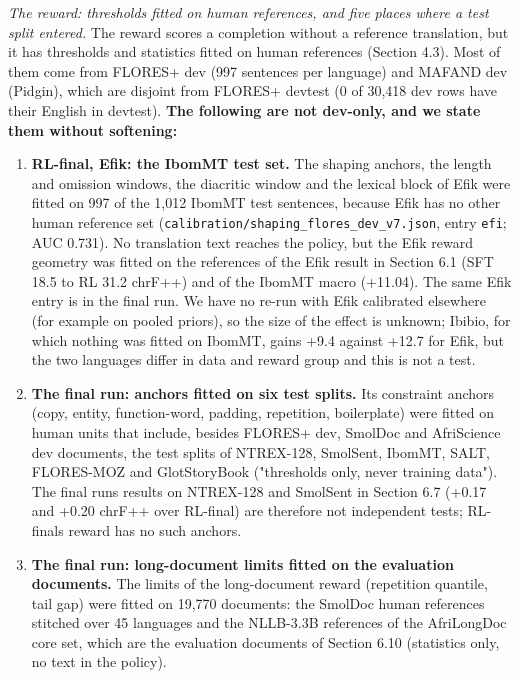 \emph{The reward: thresholds fitted on human references, and five places where a test split entered.} The reward scores a completion without a reference translation, but it has thresholds and statistics fitted on human references (Section 4.3). Most of them come from FLORES+ dev (997 sentences per language) and MAFAND dev (Pidgin), which are disjoint from FLORES+ devtest (0 of 30,418 dev rows have their English in devtest). \textbf{The following are not dev-only, and we state them without softening:}

\begin{enumerate}
\def\labelenumi{\arabic{enumi}.}
\tightlist
\item
  \textbf{RL-final, Efik: the IbomMT test set.} The shaping anchors, the length and omission windows, the diacritic window and the lexical block of Efik were fitted on 997 of the 1,012 IbomMT test sentences, because Efik has no other human reference set (\texttt{calibration/shaping\_flores\_dev\_v7.json}, entry \texttt{efi}; AUC 0.731). No translation text reaches the policy, but the Efik reward geometry was fitted on the references of the Efik result in Section 6.1 (SFT 18.5 to RL 31.2 chrF++) and of the IbomMT macro (+11.04). The same Efik entry is in the final run. We have no re-run with Efik calibrated elsewhere (for example on pooled priors), so the size of the effect is unknown; Ibibio, for which nothing was fitted on IbomMT, gains +9.4 against +12.7 for Efik, but the two languages differ in data and reward group and this is not a test.
\item
  \textbf{The final run: anchors fitted on six test splits.} Its constraint anchors (copy, entity, function-word, padding, repetition, boilerplate) were fitted on human units that include, besides FLORES+ dev, SmolDoc and AfriScience dev documents, the test splits of NTREX-128, SmolSent, IbomMT, SALT, FLORES-MOZ and GlotStoryBook ("thresholds only, never training data"). The final run\textquotesingle s results on NTREX-128 and SmolSent in Section 6.7 (+0.17 and +0.20 chrF++ over RL-final) are therefore not independent tests; RL-final\textquotesingle s reward has no such anchors.
\item
  \textbf{The final run: long-document limits fitted on the evaluation documents.} The limits of the long-document reward (repetition quantile, tail gap) were fitted on 19,770 documents: the SmolDoc human references stitched over 45 languages and the NLLB-3.3B references of the AfriLongDoc core set, which are the evaluation documents of Section 6.10 (statistics only, no text in the policy).

\end{enumerate}
